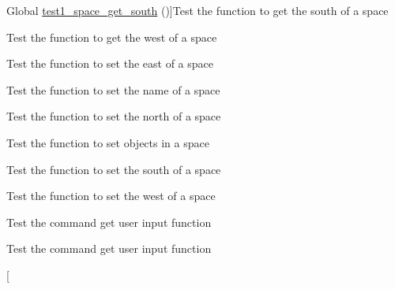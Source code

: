 \begin{DoxyRefList}
Global \hyperlink{space__test_8c_a8e345065f58565e131bdb3a9d0096ed5}{test1\+\_\+space\+\_\+get\+\_\+south} ()]Test the function to get the south of a space  
\item[\label{test__test000176}%
\Hypertarget{test__test000176}%
Global \hyperlink{space__test_8c_a1f08c6866885bfc093717f57b1b86539}{test1\+\_\+space\+\_\+get\+\_\+west} ()]Test the function to get the west of a space  
\item[\label{test__test000160}%
\Hypertarget{test__test000160}%
Global \hyperlink{space__test_8c_ab1f093af4be3ca8e525d0517cc846f47}{test1\+\_\+space\+\_\+set\+\_\+east} ()]Test the function to set the east of a space  
\item[\label{test__test000153}%
\Hypertarget{test__test000153}%
Global \hyperlink{space__test_8c_a2569bab6cfeec15f722d232bb8c78c9e}{test1\+\_\+space\+\_\+set\+\_\+name} ()]Test the function to set the name of a space  
\item[\label{test__test000156}%
\Hypertarget{test__test000156}%
Global \hyperlink{space__test_8c_a3d3457a89f705948102cf1e5d4a7b45b}{test1\+\_\+space\+\_\+set\+\_\+north} ()]Test the function to set the north of a space  
\item[\label{test__test000164}%
\Hypertarget{test__test000164}%
Global \hyperlink{space__test_8c_a208ae9352ff979024f6ebef4e791356a}{test1\+\_\+space\+\_\+set\+\_\+object} ()]Test the function to set objects in a space  
\item[\label{test__test000158}%
\Hypertarget{test__test000158}%
Global \hyperlink{space__test_8c_a21938e16547b3080e9251f960117a859}{test1\+\_\+space\+\_\+set\+\_\+south} ()]Test the function to set the south of a space  
\item[\label{test__test000162}%
\Hypertarget{test__test000162}%
Global \hyperlink{space__test_8c_ab680a8797f793dffd58546074b87d21f}{test1\+\_\+space\+\_\+set\+\_\+west} ()]Test the function to set the west of a space  
\item[\label{test__test000044}%
\Hypertarget{test__test000044}%
Global \hyperlink{command__test_8c_a92cce7477f40656ebebe28d56142b528}{test20\+\_\+command\+\_\+get\+\_\+user\+\_\+input} ()]Test the command get user input function  
\item[\label{test__test000045}%
\Hypertarget{test__test000045}%
Global \hyperlink{command__test_8c_aaf02a6c7423e84f000c00b8218a8a9a1}{test21\+\_\+command\+\_\+get\+\_\+user\+\_\+input} ()]Test the command get user input function  
\item[\label{test__test000046}%
%

\end{DoxyRefList}
